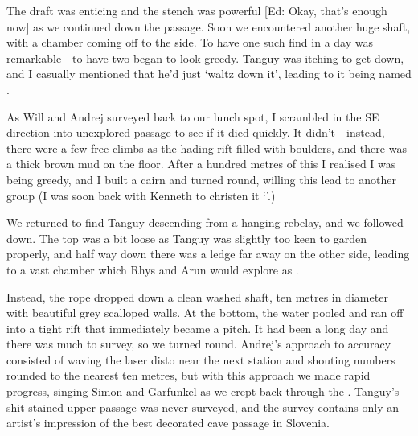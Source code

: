 The draft was enticing and the stench was powerful [Ed: Okay, that’s enough now] as we continued down the passage. Soon we encountered another huge shaft, with a chamber coming off to the side. To have one such find in a day was remarkable - to have two began to look greedy. Tanguy was itching to get down, and I casually mentioned that he’d just ‘waltz down it’, leading to it being named .

 
As Will and Andrej surveyed back to our lunch spot, I scrambled in the SE direction into unexplored passage to see if it died quickly. It didn’t - instead, there were a few free climbs as the hading rift filled with boulders, and there was a thick brown mud on the floor. After a hundred metres of this I realised I was being greedy, and I built a cairn and turned round, willing this lead to another group (I was soon back with Kenneth to christen it ‘’.)
 
We returned to find Tanguy descending from a hanging rebelay, and we followed down. The top was a bit loose as Tanguy was slightly too keen to garden properly, and half way down there was a ledge far away on the other side, leading to a vast chamber which Rhys and Arun would explore as .
 
Instead, the rope dropped down a clean washed shaft, ten metres in diameter with beautiful grey scalloped walls. At the bottom, the water pooled and ran off into a tight rift that immediately became a pitch. It had been a long day and there was much to survey, so we turned round. Andrej’s approach to accuracy consisted of waving the laser disto near the next station and shouting numbers rounded to the nearest ten metres, but with this approach we made rapid progress, singing Simon and Garfunkel as we crept back through the . Tanguy’s shit stained upper passage was never surveyed, and the survey contains only an artist's impression of the best decorated cave passage in Slovenia.



